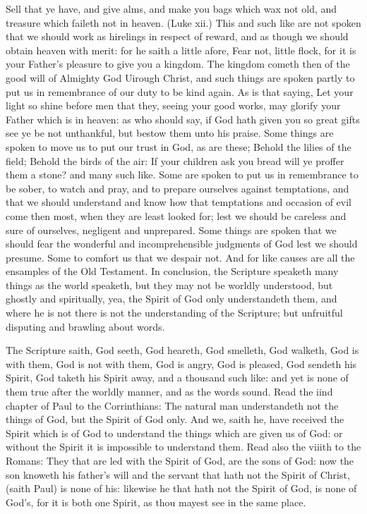 Sell that ye have, and give alms, and make you bags 
which wax not old, and treasure which faileth not in heaven. 
(Luke xii.) This and such like are not spoken that we should 
work as hirelings in respect of reward, and as though we 
should obtain heaven with merit: for he saith a little afore, 
Fear not, little flock, for it is your Father's pleasure to give 
you a kingdom. The kingdom cometh then of the good will 
of Almighty God Uirough Christ, and such things are spoken 
partly to put us in remembrance of our duty to be kind 
again. As is that saying, Let your light so shine before 
men that they, seeing your good works, may glorify your 
Father which is in heaven: as who should say, if God 
hath given you so great gifts see ye be not unthankful, but 
bestow them unto his praise. Some things are spoken to 
move us to put our trust in God, as are these; Behold the 
lilies of the field; Behold the birds of the air: If your 
children ask you bread will ye proffer them a stone? and many 
such like. Some are spoken to put us in remembrance to 
be sober, to watch and pray, and to prepare ourselves 
against temptations, and that we should understand and 
know how that temptations and occasion of evil come then 
most, when they are least looked for; lest we should be 
careless and sure of ourselves, negligent and unprepared. 
Some things are spoken that we should fear the wonderful
and incomprehensible judgments of God lest we should 
presume. Some to comfort us that we despair not. And for 
like causes are all the ensamples of the Old Testament. 
In conclusion, the Scripture speaketh many things as the 
world speaketh, but they may not be worldly understood, 
but ghostly and spiritually, yea, the Spirit of God only understandeth
them, and where he is not there is not the understanding
of the Scripture; but unfruitful disputing and 
brawling about words. 

The Scripture saith, God seeth, God heareth, God smelleth,
God walketh, God is with them, God is not with 
them, God is angry, God is pleased, God sendeth his Spirit, 
God taketh his Spirit away, and a thousand such like: and 
yet is none of them true after the worldly manner, and as the 
words sound. Read the iind chapter of Paul to the Corrinthians:
The natural man understandeth not the things 
of God, but the Spirit of God only. And we, saith he, have 
received the Spirit which is of God to understand the things 
which are given us of God: or without the Spirit it is impossible
to understand them. Read also the viiith to the 
Romans: They that are led with the Spirit of God, are 
the sons of God: now the son knoweth his father's will 
and the servant that hath not the Spirit of Christ, (saith 
Paul) is none of his: likewise he that hath not the Spirit 
of God, is none of God's, for it is both one Spirit, as thou 
mayest see in the same place. 


